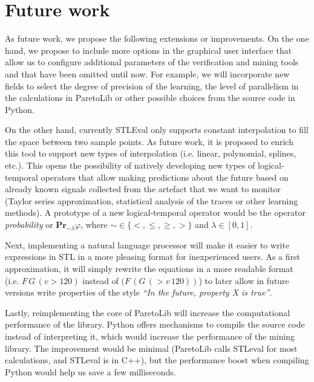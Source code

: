 \section{Future work}
As future work, we propose the following extensions or improvements. On the one hand, we propose to include more options in the graphical user interface that allow us to configure additional parameters of the verification and mining tools and that have been omitted until now. For example, we will incorporate new fields to select the degree of precision of the learning, the level of parallelism in the calculations in ParetoLib or other possible choices from the source code in Python.


On the other hand, currently STLEval only supports constant interpolation to fill the space between two sample points. As future work, it is proposed to enrich this tool to support new types of interpolation (i.e. linear, polynomial, splines, etc.). This opens the possibility of natively developing new types of logical-temporal operators that allow making predictions about the future based on already known signals collected from the artefact that we want to monitor (Taylor series approximation, statistical analysis of the traces or other learning methods). A prototype of a new logical-temporal operator would be the operator \textit{probability} or $\mathbf{Pr}_{\sim \lambda}\varphi$, where $\sim \in \{<, \leq, \geq, >\}$ and $\lambda \in [0, 1]$.

Next, implementing a natural language processor will make it easier to write expressions in STL in a more pleasing format for inexperienced users. As a first approximation, it will simply rewrite the equations in a more readable format (i.e. $F\, G\, (v > 120)$ instead of $(F \, (G \, ( > v \, 120))$) to later allow in future versions write properties of the style \textit{``In the future, property X is true''}.

Lastly, reimplementing the core of ParetoLib will increase the computational performance of the library. Python offers mechanisms to compile the source code instead of interpreting it, which would increase the performance of the mining library. The improvement would be minimal (ParetoLib calls STLeval for most calculations, and STLeval is in C++), but the performance boost when compiling Python would help us save a few milliseconds.